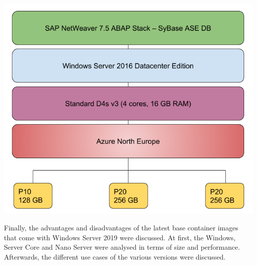 \documentclass[a0,portrait]{a0poster}
\begin{document}
\begin{multicols}{2}
\begin{center}\vspace{1cm}
    \includegraphics[width=1.0\linewidth]{../bachproef/img/Methodologie/SAP_PO}
\end{center}\vspace{1cm}
\vfill\null
\columnbreak

Finally, the advantages and disadvantages of the latest base container images that come with Windows Server 2019 were discussed.
At first, the Windows, Server Core and Nano Server were analysed in terms of size and performance. \\
Afterwards, the different use cases of the various versions were discussed.


\end{multicols}
\end{document}
